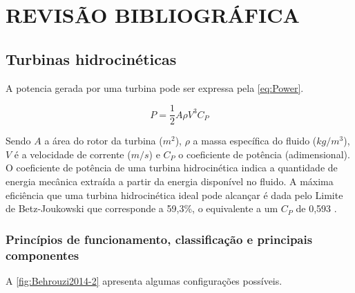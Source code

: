
\chapter{REVISÃO BIBLIOGRÁFICA}
\label{chap:fundamentacaoTeorica}

\section{Turbinas hidrocinéticas}

A potencia gerada por uma turbina pode ser expressa pela \autoref{eq:Power}.

\begin{equation}
P = \frac{1}{2}A\rho {V^3}{C_P}
\label{eq:Power}
\end{equation}

Sendo $A$ a área do rotor da turbina ($m^2$), $\rho$ a massa específica do fluido ($kg/{m}^3$), $V$ é a velocidade de corrente ($m/s$) e $C_P$ o coeficiente de potência (adimensional). O coeficiente de potência de uma turbina hidrocinética indica a quantidade de energia mecânica extraída a partir da energia disponível no fluido. A máxima eficiência que uma turbina hidrocinética ideal pode alcançar é dada pelo Limite de Betz-Joukowski que corresponde a 59,3\%, o equivalente a um $C_P$ de 0,593 \cite{vallverdu2014, SHINOMIYA2015d}.

\subsection{Princípios de funcionamento, classificação e principais componentes}

A \autoref{fig:Behrouzi2014-2} apresenta algumas configurações possíveis.


